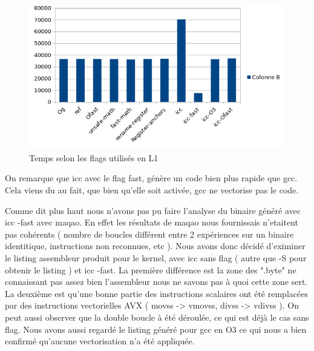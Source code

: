 \documentclass{report}
\begin{document}
\newpage
   \begin{figure}[ht!]
        \centering
        \includegraphics[width=120mm]{MEDIA/time_L1.png}
        \caption{Temps selon les flags utilisés en L1}
    \end{figure}
On remarque que icc avec le flag fast, génère un code bien plus rapide que gcc.
Cela viens du au fait, que bien qu'elle soit activée, gcc ne vectorise pas le code.

Comme dit plus haut nous n'avons pas pu faire l'analyse du binaire généré avec icc -fast avec maqao. En effet les résultats de maqao nous fournissais n'etaitent pas cohérents 
( nombre de boucles différent entre 2 expériences sur un binaire identitique, instructions non reconnues, etc ). Nous avons donc décidé d'eximiner le listing assembleur produit pour le kernel,
 avec icc sans flag ( autre que -S pour obtenir le listing ) et icc -fast. La première différence est la zone des ".byte" ne connaissant pas assez bien l'assembleur nous ne savons pas à quoi cette zone sert.
La deuxième est qu'une bonne partie des instructions scalaires ont été remplacées par des instructions vectorielles AVX
( movss -> vmovss, divss -> vdivss ). On peut aussi observer que la double boucle à été déroulée, ce qui est déjà le cas sans flag. Nous avons aussi regardé le listing généré pour gcc en O3 ce qui nous a bien confirmé qu'aucune vectorisation n'a été appliquée. 
\end{document}
